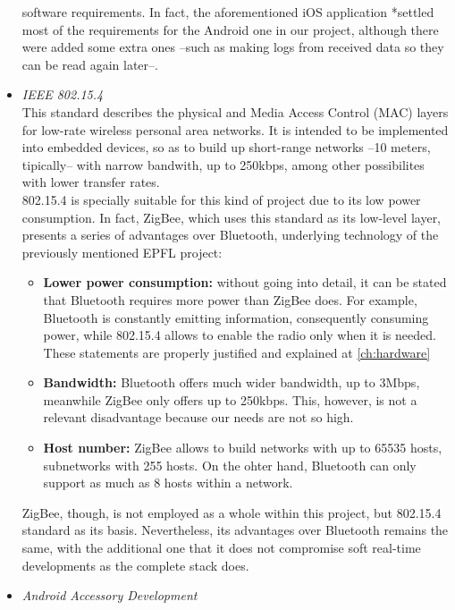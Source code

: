 \begin{itemize}
				software requirements. In fact, the aforementioned iOS application *settled most of the
				requirements for the Android one in our project, although there were added some extra ones --such as
				making logs from received data so they can be read again later--.\\
			\item \emph{IEEE 802.15.4}\\
				This standard describes the physical and Media Access Control (MAC) layers for low-rate wireless
				personal area networks. It is intended to be implemented into embedded devices, so as to build up
				short-range networks --10 meters, tipically-- with narrow bandwith, up to 250kbps, among other
				possibilites with lower transfer rates.\\
				802.15.4 is specially suitable for this kind of project due to its low power consumption. In
				fact, ZigBee, which uses this standard as its low-level layer, presents a series of advantages
				over Bluetooth, underlying technology of the previously mentioned EPFL project:
				\begin{itemize}
					\item \textbf{Lower power consumption:} without going into detail, it can be stated that Bluetooth 
						requires more power than ZigBee does. For example, Bluetooth is constantly emitting information,
						consequently consuming power, while 802.15.4 allows to enable the radio only when it is needed.
						These statements are properly justified and explained at \autoref{ch:hardware}
					\item \textbf{Bandwidth:} Bluetooth offers much wider bandwidth, up to 3Mbps, meanwhile ZigBee 
						only offers up to 250kbps. This, however, is not a relevant disadvantage because our needs 
						are not so high.
					\item \textbf{Host number:} ZigBee allows to build networks with up to 65535 hosts, subnetworks 
						with 255 hosts. On the ohter hand, Bluetooth can only support as much as 8 hosts within a 
						network. 
				\end{itemize}
				ZigBee, though, is not employed as a whole within this project, but 802.15.4 standard as
				its basis. Nevertheless, its advantages over Bluetooth remains the same, with the additional one
				that it does not compromise soft real-time developments as the complete stack does.\\
			\item \emph{Android Accessory Development}\\

\end{itemize}
